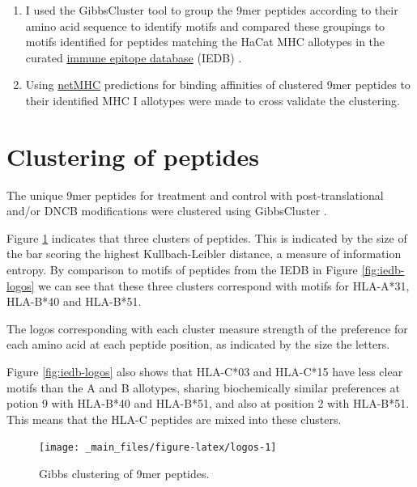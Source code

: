 \documentclass[12pt,]{book}
\begin{document}
\begin{enumerate}
\def\labelenumi{\arabic{enumi}.}
\item
  I used the GibbsCluster tool \citep{andreatta2017} to group the 9mer
  peptides according to their amino acid sequence to identify motifs and
  compared these groupings to motifs identified for peptides matching
  the HaCat MHC allotypes in the curated
  \href{http://www.iedb.org/}{immune epitope database} (IEDB)
  \citep{vita2015}.
\item
  Using \href{http://www.cbs.dtu.dk/services/NetMHC/}{netMHC}
  \citep{nielsen2003, andreatta2016} predictions for binding affinities
  of clustered 9mer peptides to their identified MHC I allotypes were
  made to cross validate the clustering.
\end{enumerate}

\hypertarget{clustering-of-peptides}{\section{Clustering of
peptides}\label{clustering-of-peptides}}

The unique 9mer peptides for treatment and control with
post-translational and/or DNCB modifications were clustered using
GibbsCluster \citep{andreatta2017}.

Figure \ref{fig:logos} indicates that three clusters of peptides. This
is indicated by the size of the bar scoring the highest Kullbach-Leibler
distance, a measure of information entropy. By comparison to motifs of
peptides from the IEDB in Figure \ref{fig:iedb-logos} we can see that
these three clusters correspond with motifs for HLA-A*31, HLA-B*40 and
HLA-B*51.

The logos corresponding with each cluster measure strength of the
preference for each amino acid at each peptide position, as indicated by
the size the letters.

Figure \ref{fig:iedb-logos} also shows that HLA-C*03 and HLA-C*15 have
less clear motifs than the A and B allotypes, sharing biochemically
similar preferences at potion 9 with HLA-B*40 and HLA-B*51, and also at
position 2 with HLA-B*51. This means that the HLA-C peptides are mixed
into these clusters.



\begin{figure}

{\centering \texttt{[image: \_main\_files/figure-latex/logos-1]} 

}

\caption{Gibbs clustering of 9mer peptides.}\label{fig:logos}
\end{figure}
\end{document}
